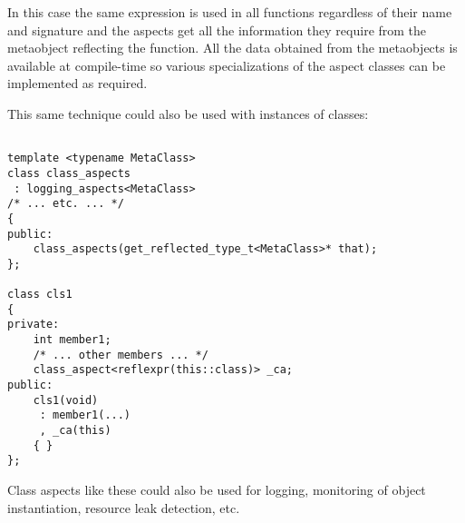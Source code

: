 In this case the same expression is used in all functions
regardless of their name and signature and the aspects get all the information
they require from the metaobject reflecting the function. All the data
obtained from the metaobjects is available at compile-time so various
specializations of the aspect classes can be implemented as required.

This same technique could also be used with instances of classes:

\begin{verbatim}

template <typename MetaClass>
class class_aspects
 : logging_aspects<MetaClass>
/* ... etc. ... */
{
public:
	class_aspects(get_reflected_type_t<MetaClass>* that);
};

class cls1
{
private:
	int member1;
	/* ... other members ... */
	class_aspect<reflexpr(this::class)> _ca;
public:
	cls1(void)
	 : member1(...)
	 , _ca(this)
	{ }
};

\end{verbatim}

Class aspects like these could also be used for logging, monitoring of object
instantiation, resource leak detection, etc.


